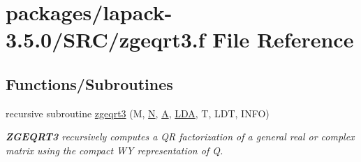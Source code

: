 \hypertarget{zgeqrt3_8f}{}\section{packages/lapack-\/3.5.0/\+S\+R\+C/zgeqrt3.f File Reference}
\label{zgeqrt3_8f}
\subsection*{Functions/\+Subroutines}
\begin{DoxyCompactItemize}
\item 
recursive subroutine \hyperlink{group__complex16GEcomputational_gafdc1b602bb1d2232ab128f5e15ead515}{zgeqrt3} (M, \hyperlink{polmisc_8c_a0240ac851181b84ac374872dc5434ee4}{N}, \hyperlink{classA}{A}, \hyperlink{example__user_8c_ae946da542ce0db94dced19b2ecefd1aa}{L\+D\+A}, T, L\+D\+T, I\+N\+F\+O)
\begin{DoxyCompactList}\small\item\em {\bfseries Z\+G\+E\+Q\+R\+T3} recursively computes a Q\+R factorization of a general real or complex matrix using the compact W\+Y representation of Q. \end{DoxyCompactList}\end{DoxyCompactItemize}
